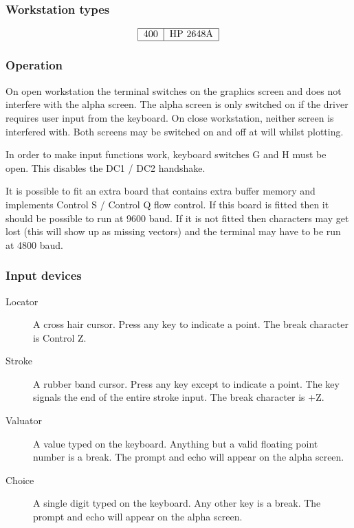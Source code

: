\subsubsection{Workstation types}
\[\begin{tabular}{|l|l|}\hline
400 &HP 2648A\\\hline
\end{tabular}\]

\subsubsection{Operation}
On open workstation the terminal switches on the graphics screen and does not
interfere with the alpha screen. The alpha screen is only switched on if the
driver requires user input from the keyboard. On close workstation, neither
screen is interfered with. Both screens may be switched on and off at will
whilst plotting.

In order to make input functions work, keyboard switches G and H must be open.
This disables the DC1 / DC2 handshake.

It is possible to fit an extra board that contains extra buffer memory and
implements Control S / Control Q flow control. If this board is fitted then it
should be possible to run at 9600 baud. If it is not fitted then characters may
get lost (this will show up as missing vectors) and the terminal may have to be
run at 4800 baud.

\subsubsection{Input devices}
\begin{description}
\item[Locator] A cross hair cursor.
Press any key to indicate a point.
The break character is Control Z.
\item[Stroke] A rubber band cursor.
Press any key except  to indicate a point.
The  key signals the end of the entire stroke input.
The break character is +Z.
\item[Valuator] A value typed on the keyboard.
Anything but a valid floating point number is a break.
The prompt and echo will appear on the alpha screen.
\item[Choice] A single digit typed on the keyboard.
Any other key is a break.
The prompt and echo will appear on the alpha screen.
\end{description}

